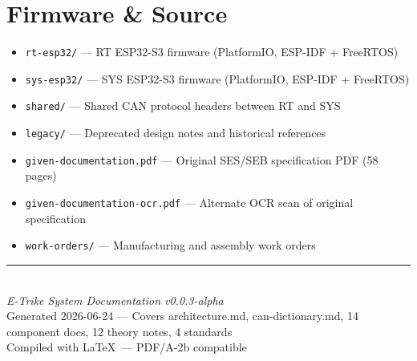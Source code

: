 \documentclass[12pt,a4paper,oneside]{report}
\begin{document}
\section{Firmware \& Source}

\begin{itemize}[leftmargin=*,nosep]
  \item \texttt{rt-esp32/} --- RT ESP32-S3 firmware (PlatformIO, ESP-IDF + FreeRTOS)
  \item \texttt{sys-esp32/} --- SYS ESP32-S3 firmware (PlatformIO, ESP-IDF + FreeRTOS)
  \item \texttt{shared/} --- Shared CAN protocol headers between RT and SYS
  \item \texttt{legacy/} --- Deprecated design notes and historical references
  \item \texttt{given-documentation.pdf} --- Original SES/SEB specification PDF (58 pages)
  \item \texttt{given-documentation-ocr.pdf} --- Alternate OCR scan of original specification
  \item \texttt{work-orders/} --- Manufacturing and assembly work orders
\end{itemize}

\vfill

\begin{center}
  \rule{0.5\textwidth}{0.4pt}\\[4mm]
  {\small\textit{E-Trike System Documentation v0.0.3-alpha}}\\[2mm]
  {\small Generated 2026-06-24 --- Covers architecture.md, can-dictionary.md, 14 component docs, 12 theory notes, 4 standards}\\[2mm]
  {\small Compiled with \LaTeX\ --- PDF/A-2b compatible}
\end{center}
\end{document}
